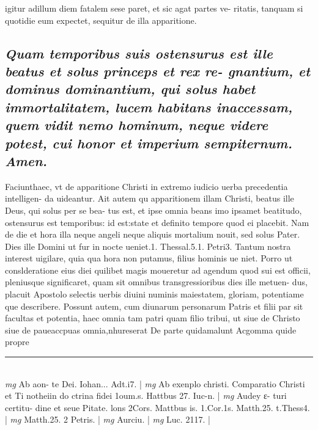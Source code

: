 \documentclass{article}
\begin{document}
\begin{pages}
igitur adillum diem fatalem sese paret, et sic agat partes ve- ritatis, tanquam si quotidie eum expectet, sequitur de illa apparitione.  \pend
{}
{}
\subsection*{\textit{Quam temporibus suis ostensurus est ille beatus et solus princeps et rex re- gnantium, et dominus dominantium, qui solus habet immortalitatem, lucem habitans inaccessam, quem vidit nemo hominum, neque videre potest, cui honor et imperium sempiternum. Amen. }}\pstart Faciunthaec, vt de apparitione Christi in extremo iudicio uerba precedentia intelligen- da uideantur. Ait autem qu apparitionem illam Christi, beatus ille Deus, qui solus per se bea- tus est, et ipse omnia beans imo ipsamet beatitudo, ostensurus est temporibus: id est:state et definito tempore quod ei placebit. Nam de die et hora illa neque angeli neque aliquis mortalium nouit, sed solus Pater. Dies ille Domini ut fur in nocte ueniet.1. Thessal.5.1. Petri3. Tantum nostra interest uigilare, quia qua hora non putamus, filius hominis ue niet. Porro ut conslderatione eius diei quilibet magis moueretur ad agendum quod sui est officii, pleniusque significaret, quam sit omnibus transgressioribus dies ille metuen- dus, placuit Apostolo selectis uerbis diuini numinis maiestatem, gloriam, potentiame que describere. Possunt autem, cum diunarum personarum Patris et filii par sit facultas et potentia, haec omnia tam patri quam filio tribui, ut siue de Christo siue de paueaccpuas omnia,nhureserat De parte quidamalunt Acgomma quide propre  \pend
\vspace{0.5cm}\noindent
\vspace{0.2cm}\rule{1cm}{0.2pt}\\ 
\hspace{0.2cm}\textit{mg}
\footnotesize Ab aon- te Dei. Iohan... Adt.i7. 
\normalsize| 
\hspace{0.2cm}\textit{mg}
\footnotesize Ab exenplo christi. Comparatio Christi et Ti notheiin do ctrina fidei 1oum.s. Hattbus 27. Iuc-n. 
\normalsize| 
\hspace{0.2cm}\textit{mg}
\footnotesize Audey ε- turi certitu- dine et seue Pitate. lons 2Cors. Mattbus is. 1.Cor.1s. Matth.25. t.Thess4. 
\normalsize| 
\hspace{0.2cm}\textit{mg}
\footnotesize Matth.25. 2 Petris. 
\normalsize| 
\hspace{0.2cm}\textit{mg}
\footnotesize Aurciu. 
\normalsize| 
\hspace{0.2cm}\textit{mg}
\footnotesize Luc. 2117. 
\normalsize| 

\end{pages}
\end{document}
